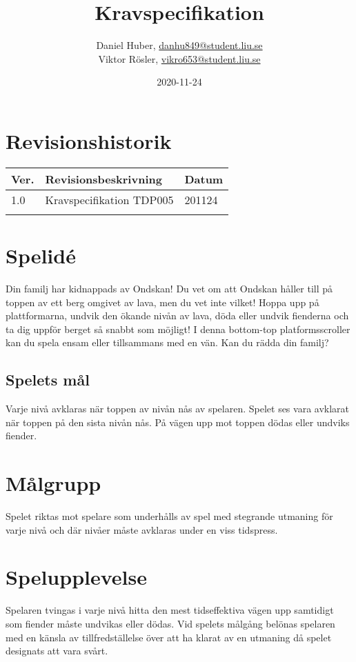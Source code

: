 \documentclass{TDP005mall}
\author{Daniel Huber, \url{danhu849@student.liu.se}\\
  Viktor Rösler, \url{vikro653@student.liu.se}}
\title{Kravspecifikation}
\date{2020-11-24}
\begin{document}
\projectpage
\tableofcontents
\newpage
\section{Revisionshistorik}
\begin{table}[!h]
\begin{tabularx}{\linewidth}{|l|X|l|}
\hline
  Ver. & Revisionsbeskrivning & Datum \\\hline
1.0 & Kravspecifikation TDP005 & 201124 \\\hline
\\\hline
\end{tabularx}
\end{table}


\section{Spelid\'{e} }
Din familj har kidnappads av Ondskan! Du vet om att Ondskan håller till på toppen av ett berg omgivet av lava, men du vet inte vilket! Hoppa upp på plattformarna, undvik den ökande nivån av lava, döda eller undvik fienderna och ta dig uppför berget så snabbt som möjligt! I denna bottom-top platformsscroller kan du spela ensam eller tillsammans med en vän. Kan du rädda din familj? 

\subsection{Spelets mål}
Varje nivå avklaras när toppen av nivån nås av spelaren. Spelet ses vara avklarat när toppen på den sista nivån nås. På vägen upp mot toppen dödas eller undviks fiender. 

\section{Målgrupp}%
Spelet riktas mot spelare som underhålls av spel med stegrande utmaning för varje nivå och där nivåer måste avklaras under en viss tidspress. 

\section{Spelupplevelse}%
Spelaren tvingas i varje nivå hitta den mest tidseffektiva vägen upp samtidigt som fiender måste undvikas eller dödas. Vid spelets målgång belönas spelaren med en känsla av tillfredställelse över att ha klarat av en utmaning då spelet designats att vara svårt.
\end{document}

